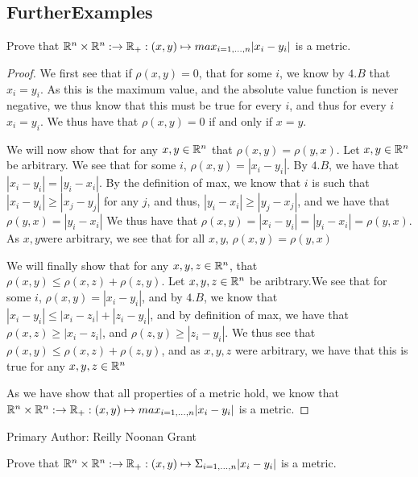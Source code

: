 \subsection{FurtherExamples}

\begin{minorEx}%
  Prove that $\mathbb{R}^n \times \mathbb{R}^n : \rightarrow \mathbb{R}_+: (x,y) \mapsto
  max_{i=1,...,n} |x_i-y_i|$ is a metric.
\end{minorEx}

\begin{proof}
  We first see that if $\rho(x,y)=0$, that for some $i$, we know by
  $4.B$ that $x_i = y_i$. As this is the maximum value, and the absolute
  value function is never negative, we thus know that this must be
  true for every $i$, and thus for every $i$ $x_i = y_i$. We thus have
  that $\rho(x,y)=0$ if and only if $x=y$.

  We will now show that for any $x,y\in \mathbb{R}^n$ that 
  $\rho(x,y) = \rho(y,x)$. Let $x,y \in \mathbb{R}^n$ be arbitrary. We see
  that for some $i$, $\rho(x,y) = |x_i-y_i|$. By $4.B$, we have that 
  $|x_i-y_i| = |y_i-x_i|$. By the definition of max, we know that $i$
  is such that $|x_i-y_i| \geq |x_j-y_j|$ for any $j$, and thus, 
 $|y_i-x_i|\geq |y_j-x_j|$, and we have that $\rho(y,x)=|y_i-x_i|$
 We thus have that $\rho(x,y)=|x_i-y_i| = |y_i-x_i|=\rho(y,x)$. As
 $x,y$were arbitrary, we see that for all $x,y$, $\rho(x,y) =
 \rho(y,x)$

 We will finally show that for any $x,y,z\in \mathbb{R}^n$, that
 $\rho(x,y)\leq \rho(x,z)+ \rho(z,y)$. Let $x,y,z \in \mathbb{R}^n$ be aribtrary.We see that for some $i$, 
 $\rho(x,y) = |x_i-y_i|$, and by $4.B$, we know that $ |x_i-y_i| \leq
 |x_i-z_i| +|z_i-y_i|$, and by definition of max, we have that
 $\rho(x,z)\geq |x_i-z_i|$, and  $\rho(z,y)\geq |z_i-y_i|$. We thus
 see that $\rho(x,y)\leq \rho(x,z)+ \rho(z,y)$, and as $x,y,z$ were
 arbitrary, we have that this is true for any $x,y,z\in \mathbb{R}^n$

 As we have show that all properties of a metric hold, we know that 
 $\mathbb{R}^n \times \mathbb{R}^n : \rightarrow \mathbb{R}_+: (x,y) \mapsto
  max_{i=1,...,n} |x_i-y_i|$ is a metric.
\end{proof}

Primary Author: Reilly Noonan Grant

\begin{minorEx}%
  Prove that $\mathbb{R}^n \times \mathbb{R}^n :\rightarrow \mathbb{R}_+: (x,y) \mapsto
  \Sigma_{i=1,...,n} |x_i- y_i|$ is a metric.
\end{minorEx}

